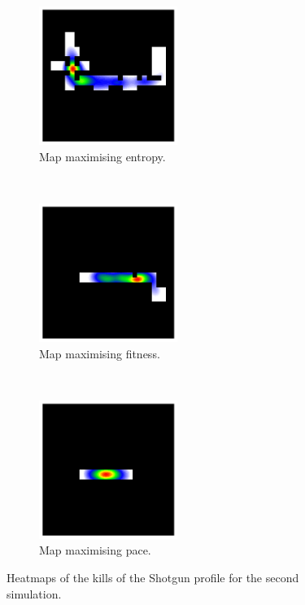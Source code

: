 \begin{figure}[H]
    \centering
    \begin{subfigure}[t]{0.3\textwidth}
        \centering
        \includegraphics[height=4.5cm]{Images/images/experiment_one/best_entropy_pop_1/kills_bot_0.png}
        \caption{Map maximising entropy.}
    \end{subfigure}%
    ~ 
    \begin{subfigure}[t]{0.3\textwidth}
        \centering
        \includegraphics[height=4.5cm]{Images/images/experiment_one/best_fitness_pop_1/kills_bot_0.png}
        \caption{Map maximising fitness.}
    \end{subfigure}
    ~ 
    \begin{subfigure}[t]{0.3\textwidth}
        \centering
        \includegraphics[height=4.5cm]{Images/images/experiment_one/best_pace_pop_1/kills_bot_0.png}
        \caption{Map maximising pace.}
    \end{subfigure}
    \caption{Heatmaps of the kills of the Shotgun profile for the second simulation.}
\end{figure}
